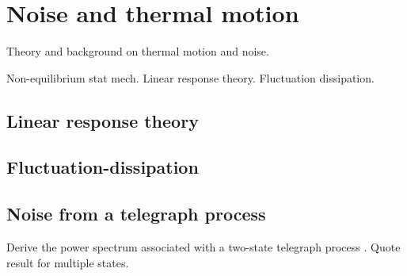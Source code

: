 \chapter{Noise and thermal motion}
\label{noise}

Theory and background on thermal motion and noise.

Non-equilibrium stat mech.  Linear response theory.  Fluctuation dissipation.

\section{Linear response theory}

\section{Fluctuation-dissipation}

\section{Noise from a telegraph process}

Derive the power spectrum associated with a two-state telegraph process \citep{Dutta1981}.  Quote result for multiple states.